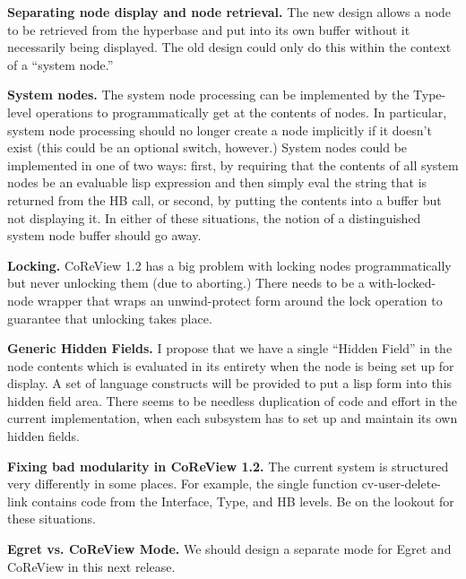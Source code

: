 \begin{itemizenoindent}
\item {\bf Separating node display and node retrieval.} The new design
allows a node to be retrieved from the hyperbase and put into its own buffer
without it necessarily being displayed.  The old design could only do
this within the context of a ``system node.''  

\item {\bf System nodes.}  The system node processing can be 
implemented by the Type-level operations to programmatically get at the 
contents of nodes.  In particular, system node processing should no longer
create a node implicitly if it doesn't exist (this could be an optional
switch, however.)  System nodes could be implemented in one of two 
ways: first, by requiring that the contents of all system nodes be
an evaluable lisp expression and then simply eval the string that is
returned from the HB call, or second, by putting the contents into a 
buffer but not displaying it.  In either of these situations, the notion
of a distinguished system node buffer should go away.

\item {\bf Locking.}  CoReView 1.2 has a big problem with locking nodes
programmatically but never unlocking them (due to aborting.)  There needs
to be a with-locked-node wrapper that wraps an unwind-protect form around
the lock operation to guarantee that unlocking takes place.

\item {\bf Generic Hidden Fields.}  I propose that we have a single 
``Hidden Field'' in the node contents which is evaluated in its entirety
when the node is being set up for display.  A set of language constructs
will be provided to put a lisp form into this hidden field area. There
seems to be needless duplication of code and effort in the current
implementation, when each subsystem has to set up and maintain its own
hidden fields.

\item {\bf Fixing bad modularity in CoReView 1.2.}  The current system
is structured very differently in some places.  For example, the
single function cv-user-delete-link contains code from the Interface, 
Type, and HB levels.  Be on the lookout for these situations.

\item {\bf Egret vs. CoReView Mode.}  We should design a separate
mode for Egret and CoReView in this next release.  


\end{itemizenoindent}
